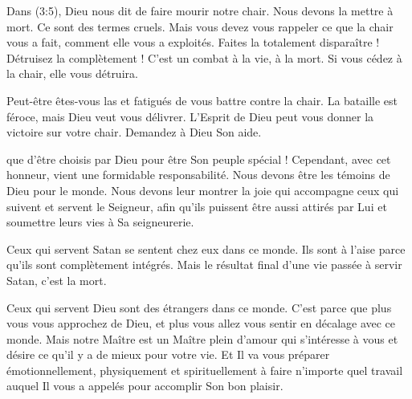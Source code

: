 
Dans (3:5), Dieu nous dit de faire mourir notre chair.
 Nous devons la mettre à mort. Ce sont des termes cruels.
 Mais vous devez vous rappeler ce que la chair vous a fait,
 comment elle vous a exploités. Faites la totalement disparaître !
 Détruisez la complètement ! C'est un combat à la vie, à la mort.
 Si vous cédez à la chair, elle vous détruira.

Peut-être êtes-vous las et fatigués de vous battre contre la chair.
 La bataille est féroce, mais Dieu veut vous délivrer.
 L'Esprit de Dieu peut vous donner la victoire sur votre chair.
 Demandez à Dieu Son aide. 

\dvrule






 que d'être choisis par Dieu
 pour être Son peuple spécial !
 Cependant, avec cet honneur, vient une formidable responsabilité.
 Nous devons être les témoins de Dieu pour le monde.
 Nous devons leur montrer la joie qui accompagne ceux qui suivent
 et servent le Seigneur, afin qu'ils puissent être aussi attirés par Lui
 et soumettre leurs vies à Sa seigneurerie.


Ceux qui servent Satan se sentent chez eux dans ce monde.
 Ils sont à l'aise parce qu'ils sont complètement intégrés.
 Mais le résultat final d'une vie passée à servir Satan, c'est la mort.

Ceux qui servent Dieu sont des étrangers dans ce monde.
 C'est parce que plus vous vous approchez de Dieu,
 et plus vous allez vous sentir en décalage avec ce monde.
 Mais notre Maître est un Maître plein d'amour qui s'intéresse à vous
 et désire ce qu'il y a de mieux pour votre vie.
 Et Il va vous préparer émotionnellement, physiquement et spirituellement
 à faire n'importe quel travail auquel Il vous a appelés
 pour accomplir Son bon plaisir.

